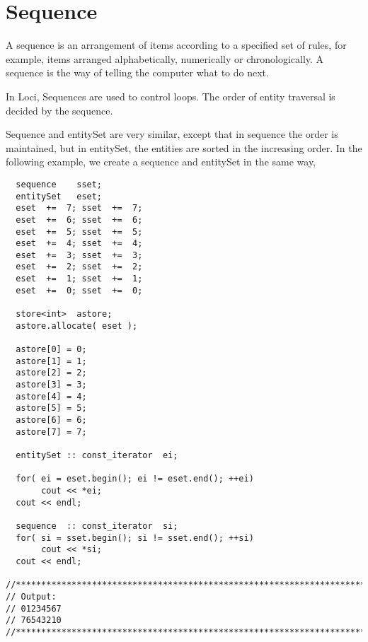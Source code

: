 \section { Sequence }
A sequence is an arrangement of items according to a specified set of rules, for
example, items arranged alphabetically, numerically or chronologically. A sequence
is the way of telling the computer what to do next.

\par In Loci, Sequences are used to control loops. The order of entity traversal
is decided by the sequence. 

Sequence and entitySet are very similar, except that in sequence the order is
maintained, but in entitySet, the entities are sorted in the increasing order.
In the following example, we create a sequence and entitySet in the same way,

\begin{verbatim}
  sequence    sset;
  entitySet   eset;
  eset  +=  7; sset  +=  7;
  eset  +=  6; sset  +=  6;
  eset  +=  5; sset  +=  5;
  eset  +=  4; sset  +=  4;
  eset  +=  3; sset  +=  3;
  eset  +=  2; sset  +=  2;
  eset  +=  1; sset  +=  1;
  eset  +=  0; sset  +=  0;

  store<int>  astore;
  astore.allocate( eset );

  astore[0] = 0;
  astore[1] = 1;
  astore[2] = 2;
  astore[3] = 3;
  astore[4] = 4;
  astore[5] = 5;
  astore[6] = 6;
  astore[7] = 7;

  entitySet :: const_iterator  ei;

  for( ei = eset.begin(); ei != eset.end(); ++ei)
       cout << *ei;
  cout << endl;

  sequence  :: const_iterator  si;
  for( si = sset.begin(); si != sset.end(); ++si)
       cout << *si;
  cout << endl;

//****************************************************************************
// Output:
// 01234567
// 76543210
//****************************************************************************
\end{verbatim}

